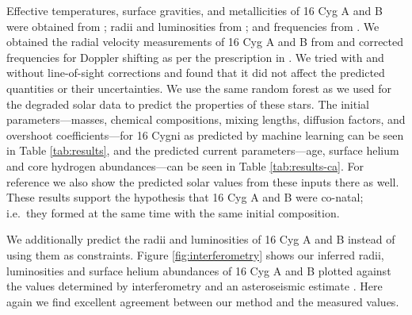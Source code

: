 \documentclass[twocolumn,twocolappendix]{aastex6}
\begin{document}
Effective temperatures, surface gravities, and metallicities of 16 Cyg A and B were obtained from \citet{2009A&A...508L..17R}; radii and luminosities from \citet{2013MNRAS.433.1262W}; and frequencies from \citet{2015MNRAS.446.2959D}. We obtained the radial velocity measurements of 16 Cyg A and B from \citet{2002ApJS..141..503N} and corrected frequencies for Doppler shifting as per the prescription in \citet{2014MNRAS.445L..94D}. We tried with and without line-of-sight corrections and found that it did not affect the predicted quantities or their uncertainties. We use the same random forest as we used for the degraded solar data to predict the properties of these stars. The initial parameters---masses, chemical compositions, mixing lengths, diffusion factors, and overshoot coefficients---for 16 Cygni as predicted by machine learning can be seen in Table \ref{tab:results}, and the predicted current parameters---age, surface helium and core hydrogen abundances---can be seen in Table \ref{tab:results-ca}. For reference we also show the predicted solar values from these inputs there as well. These results support the hypothesis that 16 Cyg A and B were co-natal; i.e.\ they formed at the same time with the same initial composition. 

We additionally predict the radii and luminosities of 16 Cyg A and B instead of using them as constraints. Figure \ref{fig:interferometry} shows our inferred radii, luminosities and surface helium abundances of 16 Cyg A and B plotted against the values determined by interferometry \citep{2013MNRAS.433.1262W} and an asteroseismic estimate \citep{2014ApJ...790..138V}. Here again we find excellent agreement between our method and the measured values. 
\end{document}
